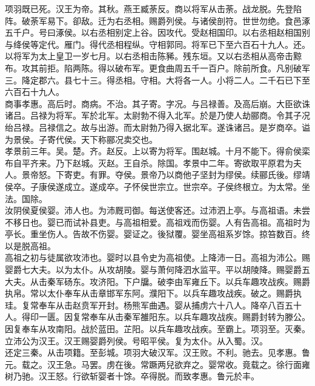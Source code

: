\documentclass{zhvt-classic}
\begin{document}
\hspace*{2em}项羽既已死。汉王为帝。其秋。燕王臧荼反。商以将军从击荼。战龙脱。先登陷阵。破荼军易下。卻敌。迁为右丞相。赐爵列侯。与诸侯剖符。世世勿绝。食邑涿五千户。号曰涿侯。以右丞相别定上谷。因攻代。受赵相国印。以右丞相赵相国别与绛侯等定代。雁门。得代丞相程纵。守相郭同。将军已下至六百石十九人。还。以将军为太上皇卫一岁七月。以右丞相击陈豨。残东垣。又以右丞相从高帝击黥布。攻其前拒。陷两陈。得以破布军。更食曲周五千一百户。除前所食。凡别破军三。降定郡六。县七十三。得丞相。守相。大将各一人。小将二人。二千石已下至六百石十九人。\\
\hspace*{2em}商事孝惠。高后时。商病。不治。其子寄。字况。与吕禄善。及高后崩。大臣欲诛诸吕。吕禄为将军。军於北军。太尉勃不得入北军。於是乃使人劫郦商。令其子况绐吕禄。吕禄信之。故与出游。而太尉勃乃得入据北军。遂诛诸吕。是岁商卒。谥为景侯。子寄代侯。天下称郦况卖交也。\\
\hspace*{2em}孝景前三年。吴。楚。齐。赵反。上以寄为将军。围赵城。十月不能下。得俞侯栾布自平齐来。乃下赵城。灭赵。王自杀。除国。孝景中二年。寄欲取平原君为夫人。景帝怒。下寄吏。有罪。夺侯。景帝乃以商他子坚封为缪侯。续郦氏後。缪靖侯卒。子康侯遂成立。遂成卒。子怀侯世宗立。世宗卒。子侯终根立。为太常。坐法。国除。\\
\hspace*{2em}汝阴侯夏侯婴。沛人也。为沛厩司御。每送使客还。过沛泗上亭。与高祖语。未尝不移日也。婴已而试补县吏。与高祖相爱。高祖戏而伤婴。人有告高祖。高祖时为亭长。重坐伤人。告故不伤婴。婴证之。後狱覆。婴坐高祖系岁馀。掠笞数百。终以是脱高祖。\\
\hspace*{2em}高祖之初与徒属欲攻沛也。婴时以县令史为高祖使。上降沛一日。高祖为沛公。赐婴爵七大夫。以为太仆。从攻胡陵。婴与萧何降泗水监平。平以胡陵降。赐婴爵五大夫。从击秦军砀东。攻济阳。下户牖。破李由军雍丘下。以兵车趣攻战疾。赐爵执帛。常以太仆奉车从击章邯军东阿。濮阳下。以兵车趣攻战疾。破之。赐爵执珪。复常奉车从击赵贲军开封。杨熊军曲遇。婴从捕虏六十八人。降卒八百五十人。得印一匮。因复常奉车从击秦军雒阳东。以兵车趣攻战疾。赐爵封转为滕公。因复奉车从攻南阳。战於蓝田。芷阳。以兵车趣攻战疾。至霸上。项羽至。灭秦。立沛公为汉王。汉王赐婴爵列侯。号昭平侯。复为太仆。从入蜀。汉。\\
\hspace*{2em}还定三秦。从击项籍。至彭城。项羽大破汉军。汉王败。不利。驰去。见孝惠。鲁元。载之。汉王急。马罢。虏在後。常蹶两兒欲弃之。婴常收。竟载之。徐行面雍树乃驰。汉王怒。行欲斩婴者十馀。卒得脱。而致孝惠。鲁元於丰。\\
\end{document}
